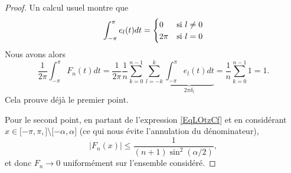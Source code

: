 \begin{proof}
    Un calcul usuel montre que
    \begin{equation}
        \int_{-\pi}^{\pi}e_l(t)dt=\begin{cases}
            0    &   \text{si \( l\neq 0\)}\\
            2\pi    &    \text{si \( l=0\)}
        \end{cases}
    \end{equation}
    Nous avons alors
    \begin{equation}
        \frac{1}{ 2\pi }\int_{-\pi}^{\pi}F_n(t)dt=\frac{1}{ 2\pi }\frac{1}{ n }\sum_{k=0}^{n-1}\sum_{l=-k}^k\underbrace{\int_{-\pi}^{\pi}e_l(t)dt}_{2\pi\delta_l}=\frac{1}{ n }\sum_{k=0}^{n-1}1=1.
    \end{equation}
    Cela prouve déjà le premier point.

    Pour le second point, en partant de l'expression \eqref{EqLOtzCf} et en considérant \( x\in\mathopen[ -\pi, \pi ,  \mathclose]\setminus\mathopen[ -\alpha , \alpha \mathclose]\) (ce qui nous évite l'annulation du dénominateur),
    \begin{equation}
        | F_n(x) |\leq\frac{1}{ (n+1)\sin^2(\alpha/2) },
    \end{equation}
    et donc \( F_n\to 0\) uniformément sur l'ensemble considéré.


\end{proof}
